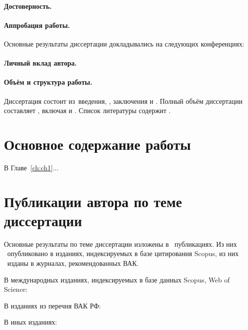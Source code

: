 \paragraph*{Достоверность.}
\paragraph*{Аппробация работы.}
Основные результаты диссертации докладывались на следующих конференциях:
\printConferenceRU

\paragraph*{Личный вклад автора.}


\paragraph*{Объём и структура работы.}
Диссертация состоит из~введения,
,
заключения и
.
%
Полный объём диссертации составляет
, включая
 и
.
Список литературы содержит
.




\newpage
\section*{Основное содержание работы}

В Главе~\ref{ch:ch1}...

\section*{Публикации автора по теме диссертации}


Основные результаты по теме диссертации изложены в \theAllMyPapers~публикациях. 
Из них \theScopusPapers~опубликовано в изданиях, индексируемых в базе цитирования Scopus, 
из них \theVakPapers~изданы в журналах, рекомендованных ВАК. 
%

В международных изданиях, индексируемых в базе данных Scopus, Web of Science:
\printPapperScopus

В изданиях из перечня ВАК РФ:

В иных изданиях:
\printPapperOther

